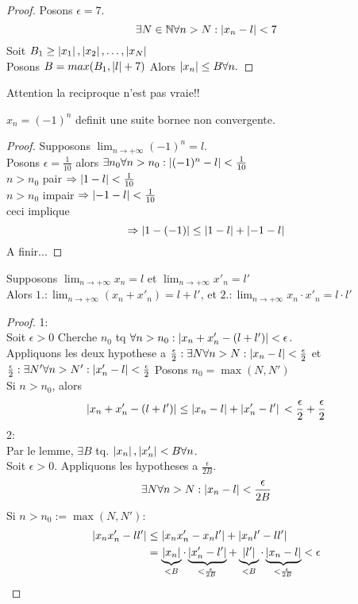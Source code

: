 \documentclass[../main.tex]{subfiles}
\begin{document}
\begin{proof}
Posons $\epsilon =7$.
\[ 
	\exists N \in \mathbb{N}\forall n >N: \left\vert x_n-l\right\vert <7
\]
Soit $ B_1 \geq \left\vert x_1\right\vert, \left\vert x_2\right\vert, \ldots, \left\vert x_N\right\vert$\\
Posons $B=max(B_1,\left\vert l\right\vert +7)$
Alors $\left\vert x_n\right\vert \leq B \forall n.$

\end{proof}
Attention la reciproque n'est pas vraie!!
\begin{exemple}
	$x_n = ( -1)^{n}$ definit une suite bornee non convergente.
\end{exemple}
\begin{proof}
	Supposons $ \lim_{n \to  + \infty} (-1)^{n} = l$.\\
	Posons $\epsilon = \frac{1}{10}$ alors $\exists n_0 \forall n> n_0: \left\vert(-1)^{n} -l\right\vert< \frac{1}{10}$\\
	$n> n_0$ pair $\Rightarrow \left\vert1-l\right\vert < \frac{1}{10}$ \\
	$n> n_0$ impair $\Rightarrow \left\vert-1-l\right\vert < \frac{1}{10}$ \\
	ceci implique
	\[ 
		\Rightarrow \left\vert1 -(-1)\right\vert \leq \left\vert1-l\right\vert + \left\vert-1-l\right\vert
	\]
	A finir...
\end{proof}
\begin{propo}
Supposons $ \lim_{n \to  + \infty} x_n =l$ et $\lim_{n \to  + \infty} x'_n = l'$ \\
Alors $1.: \lim_{n \to  + \infty} (x_n + x'_n) = l+l'$, et
$2.:\lim_{n \to  + \infty} x_n \cdot x'_n = l\cdot l'$
\end{propo}
\begin{proof}
1:\\
Soit $\epsilon>0$ Cherche $ n_0$ tq $\forall n>n_0: \left\vert x_n + x'_n - ( l+l')\right\vert< \epsilon$.\\
Appliquons les deux hypothese a $\frac{\epsilon}{2}: \exists N \forall n>N: \left\vert x_n -l\right\vert < \frac{\epsilon}{2}$ et\\
$\frac{\epsilon}{2}: \exists N' \forall n>N': \left\vert x'_n -l\right\vert < \frac{\epsilon}{2}$
Posons $ n_0= \max(N,N')$\\
Si $n>n_0$, alors
\[ 
	\left\vert x_n + x'_n - ( l+l')\right\vert \leq \left\vert x_n -l\right\vert + \left\vert x'_n -l'\right\vert\\
	< \frac{\epsilon}{2} + \frac{\epsilon}{2}
\]
2:\\
Par le lemme, $\exists B$ tq. $\left\vert x_n\right\vert, \left\vert x'_n\right\vert < B \forall n$.\\
Soit $\epsilon >0$. Appliquons les hypotheses a $\frac{\epsilon}{2B}$.
\[ 
	\exists N \forall n>N: \left\vert x_n-l\right\vert < \frac{\epsilon}{2B}
\]
Si $n>n_0:=\max(N,N'):$
\begin{align*}
	\left\vert x_nx'_n - ll'\right\vert &\leq \left\vert x_nx'_n - x_nl'\right\vert + \left\vert x_nl' - ll'\right\vert\\
			    &= \underbrace{\left\vert x_n\right\vert}_{<B} \cdot \underbrace{\left\vert x'_n - l'\right\vert}_{<\frac{\epsilon}{2B}} + \underbrace{\left\vert l'\right\vert}_{<B} \cdot \underbrace{\left\vert x_n - l\right\vert}_{< \frac{\epsilon}{2B}} < \epsilon
\end{align*}


\end{proof}
\end{document}
